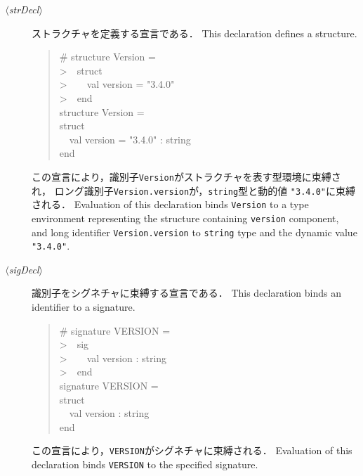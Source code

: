 \documentclass{jbook}
\newcommand{\version}{3.4.0}
\newcommand{\code}[1]{\mbox{\large\tt #1}}
\newcommand{\nonterm}[1]{\mbox{$\,\langle$}{\it #1}\mbox{$\rangle\,$}}
\newcommand{\myem}{\mbox{\ \ }}
\newenvironment{program}{\begin{quote}\begin{tt}}%
                        {\end{tt}\end{quote}}
\begin{document}
\begin{description}
\item[\nonterm{strDecl}] 
\ifjp%
	ストラクチャを定義する宣言である．
\else%
	This declaration defines a structure.
\fi%
\begin{program}
  \# structure Version =\\
  >\myem struct\\
  >\myem\myem val version = "\version"\\
  >\myem end\\
  structure Version =\\
    struct\\
    \myem  val version = "\version" : string\\
    end
\end{program}
\ifjp%
	この宣言により，識別子\code{Version}がストラクチャを表す型環境に束縛され，
ロング識別子\code{Version.version}が，\code{string}型と動的値
\code{"\version"}に束縛される．
\else%
	Evaluation of this declaration binds \code{Version} to a
type environment representing the structure containing \code{version} component,
and long identifier \code{Version.version} to \code{string} type and the
dynamic value \code{"\version"}.
\fi%

\item[\nonterm{sigDecl}] 
\ifjp%
	識別子をシグネチャに束縛する宣言である．
\else%
	This declaration binds an identifier to a signature.
\fi%
\begin{program}
  \# signature VERSION =\\
  >\myem sig\\
  >\myem\myem val version : string\\
  >\myem end\\
  signature VERSION =\\
    struct\\
    \myem  val version : string\\
    end
\end{program}
\ifjp%
	この宣言により，\code{VERSION}がシグネチャに束縛される．
\else%
	Evaluation of this declaration binds \code{VERSION} to the
specified signature.
\fi%


\end{description}
\end{document}
